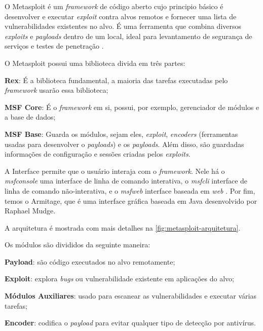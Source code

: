 O Metasploit é um \textit{framework} de código aberto cujo principio básico é desenvolver e executar \textit{exploit} contra alvos remotos e fornecer uma lista de vulnerabilidades existentes no alvo. É uma ferramenta que combina diversos \textit{exploits} e \textit{payloads} dentro de um local, ideal para levantamento de segurança de serviços e testes de penetração \cite{metasploit:yash}.  

O Metasploit possui uma biblioteca divida em três partes:

\begin{alineas}
\item \textbf{Rex}: É a biblioteca fundamental, a maioria das tarefas executadas pelo \textit{framework} usarão essa biblioteca; 
\item \textbf{MSF Core}: É o \textit{framework} em si, possui, por exemplo, gerenciador de módulos e a base de dados; 
\item \textbf{MSF Base}: Guarda os módulos, sejam eles, \textit{exploit}, \textit{encoders} (ferramentas usadas para desenvolver o \textit{payloads}) e os \textit{payloads}. Além disso, são guardadas informações de configuração e sessões criadas pelos \textit{exploits}. 
\end{alineas}

A Interface permite que o usuário interaja com o \textit{framework}. Nele há o \textit{msfconsole} uma interface de linha de comando interativa, o \textit{msfcli} interface de linha de comando não-interativa, e o \textit{msfweb} interface baseada em \textit{web} \cite{metasploittoolkit}. Por fim, temos o Armitage, que é uma interface gráfica baseada em Java desenvolvido por Raphael Mudge.

A arquitetura é mostrada com mais detalhes na \autoref{fig:metasploit-arquitetura}. 

Os módulos são divididos da seguinte maneira: 

\begin{alineas}
\item \textbf{Payload}: são código executados no alvo remotamente; 
\item \textbf{Exploit}: explora \textit{bugs} ou vulnerabilidade existente em aplicações do alvo; 
\item \textbf{Módulos Auxiliares}: usado para escanear as vulnerabilidades e executar várias tarefas; 
\item \textbf{Encoder}: codifica o \textit{payload} para evitar qualquer tipo de detecção por antivírus.
\end{alineas}

